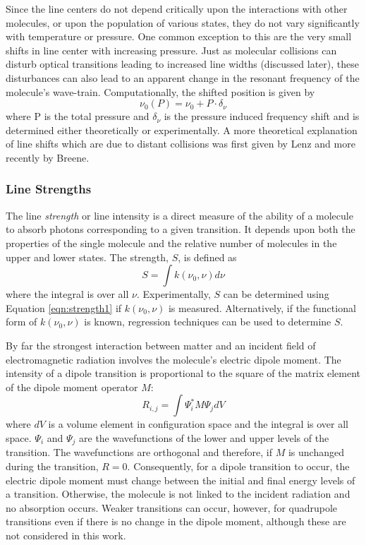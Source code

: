 \documentclass[11pt]{article}
\begin{document}
Since the line centers do not depend critically 
upon the interactions with other molecules, or upon the population of 
various states, they do not vary significantly with temperature or 
pressure. One common exception to this are the very small shifts in line 
center with increasing pressure.  Just as molecular collisions can 
disturb optical transitions leading to increased line widths 
(discussed later), these disturbances can also lead to an apparent change 
in the resonant frequency of the molecule's wave-train.  Computationally, 
the shifted position is given by
\begin{equation}
\nu_{0}(P)=\nu_{0}+P\cdot\delta_{\nu}
\end{equation}
where P is the total pressure and $\delta_{\nu}$ is the 
pressure induced frequency shift and is determined either 
theoretically or experimentally.  A more theoretical explanation of line
shifts which are due to distant collisions was first given by
Lenz and more recently by Breene\cite{bre:56}.

\subsubsection{Line Strengths}

The line {\it strength} or line intensity is a direct measure of the 
ability of a molecule to absorb photons corresponding to a given transition.
It depends upon both the properties of the single molecule and the relative
number of molecules in the upper and lower states.  The strength, $S$, is 
defined as
\begin{equation}
S=\int k(\nu_{0},\nu)d\nu
\label{eqn:strength1}
\end{equation}
where the integral is over all $\nu$.  Experimentally, $S$ can be
determined using Equation \ref{eqn:strength1} if $k(\nu_0,\nu)$ is
measured.  Alternatively, if the functional form of $k(\nu_0,\nu)$ is
known,  regression techniques can be used to determine $S$.  

By far the strongest interaction between matter and an incident field of 
electromagnetic radiation involves the molecule's electric dipole moment.  
The intensity of a dipole transition is proportional to the square of the 
matrix element of the dipole moment operator $M$:
\begin{equation}
R_{i,j}=\int \Psi_i^{*}M\Psi_j dV
\end{equation}
where $dV$ is a volume element in configuration space and the integral 
is over all space.  $\Psi_i$ and $\Psi_j$ are the wavefunctions 
of the lower and upper levels of the transition.  The 
wavefunctions are orthogonal and therefore, if $M$ is unchanged during the
transition, $R=0$.  Consequently, for a dipole transition to occur, the 
electric dipole moment must change between the initial and final energy 
levels 
of a transition.  Otherwise, the molecule is not linked to the 
incident radiation and no absorption occurs.  Weaker transitions can occur,
however, for quadrupole transitions even if there is no change in the 
dipole moment,  although these are not considered in this work.
\end{document}
